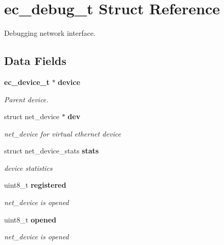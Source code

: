 \section{ec\-\_\-debug\-\_\-t \-Struct \-Reference}
\label{structec__debug__t}


\-Debugging network interface.  


\subsection*{\-Data \-Fields}
\begin{DoxyCompactItemize}
\item 
{\bf ec\-\_\-device\-\_\-t} $\ast$ {\bf device}
\begin{DoxyCompactList}\small\item\em \-Parent device. \end{DoxyCompactList}\item 
struct net\-\_\-device $\ast$ {\bf dev}\label{structec__debug__t_a9c741cbedd076599ac719146bb3bdc7d}

\begin{DoxyCompactList}\small\item\em net\-\_\-device for virtual ethernet device \end{DoxyCompactList}\item 
struct net\-\_\-device\-\_\-stats {\bf stats}\label{structec__debug__t_af6b70564444854f7f362fe5902e9dc34}

\begin{DoxyCompactList}\small\item\em device statistics \end{DoxyCompactList}\item 
uint8\-\_\-t {\bf registered}\label{structec__debug__t_afcecd6a1efb040b7b9740d6c0c48f497}

\begin{DoxyCompactList}\small\item\em net\-\_\-device is opened \end{DoxyCompactList}\item 
uint8\-\_\-t {\bf opened}\label{structec__debug__t_ac4b768dfed6808c7c0ced1de2a22aba1}

\begin{DoxyCompactList}\small\item\em net\-\_\-device is opened \end{DoxyCompactList}\end{DoxyCompactItemize}


